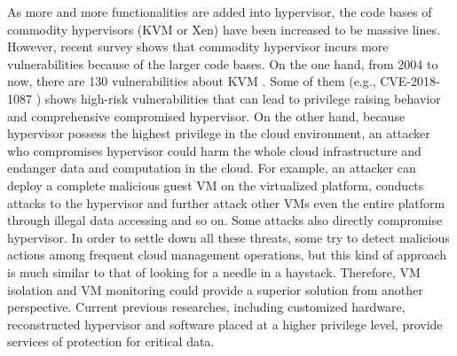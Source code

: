 \documentclass[conference]{IEEEtran}
\begin{document}
As more and more functionalities are added into hypervisor, the code bases of commodity hypervisors (KVM or Xen) have been increased to be massive lines. However, recent survey shows that commodity hypervisor incurs more vulnerabilities because of the larger code bases. 
On the one hand, from 2004 to now, there are 130 vulnerabilities about KVM \cite{kvmcve}. Some of them (e.g., CVE-2018-1087 \cite{cve2018}) shows high-risk vulnerabilities that can lead to privilege raising behavior and comprehensive compromised hypervisor.
On the other hand, because hypervisor possess the highest privilege in the cloud environment, an attacker who 
compromises hypervisor could harm the whole cloud infrastructure and endanger data and computation in the cloud. For example, an attacker can deploy a complete malicious guest VM on the virtualized platform, conducts attacks to the hypervisor and further attack other VMs even the entire platform through illegal data accessing and so on. Some attacks also directly compromise hypervisor.
In order to settle down all these threats, some try to detect malicious actions among frequent cloud management operations, but this kind of approach is much similar to that of looking for a needle in a haystack. Therefore, VM isolation and VM monitoring could provide a superior solution from another perspective. 
Current previous researches, including customized hardware, reconstructed hypervisor and software placed at a higher privilege level, provide services of protection for critical data.
\end{document}
